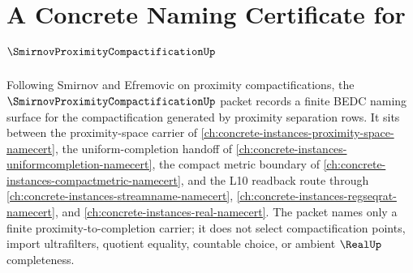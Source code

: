 \chapter{A Concrete Naming Certificate for $\SmirnovProximityCompactificationUp$}
\label{ch:concrete-instances-smirnov-proximity-compactification-namecert}

Following Smirnov and Efremovic on proximity compactifications, the $\SmirnovProximityCompactificationUp$ packet records a finite BEDC naming surface for the compactification generated by proximity separation rows. It sits between the proximity-space carrier of \autoref{ch:concrete-instances-proximity-space-namecert}, the uniform-completion handoff of \autoref{ch:concrete-instances-uniformcompletion-namecert}, the compact metric boundary of \autoref{ch:concrete-instances-compactmetric-namecert}, and the L10 readback route through \autoref{ch:concrete-instances-streamname-namecert}, \autoref{ch:concrete-instances-regseqrat-namecert}, and \autoref{ch:concrete-instances-real-namecert}. The packet names only a finite proximity-to-completion carrier; it does not select compactification points, import ultrafilters, quotient equality, countable choice, or ambient $\RealUp$ completeness.

